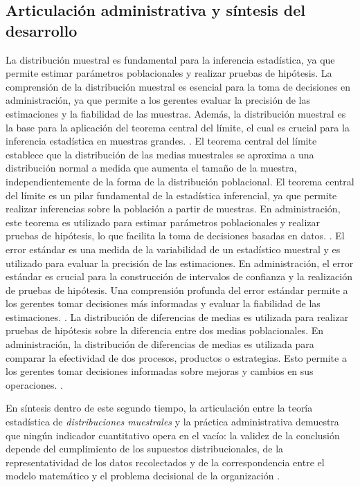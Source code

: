 {\subsection{Articulación administrativa y síntesis del desarrollo}
La distribución muestral es fundamental para la inferencia estadística, ya que permite estimar parámetros poblacionales y realizar pruebas de hipótesis. La comprensión de la distribución muestral es esencial para la toma de decisiones en administración, ya que permite a los gerentes evaluar la precisión de las estimaciones y la fiabilidad de las muestras. Además, la distribución muestral es la base para la aplicación del teorema central del límite, el cual es crucial para la inferencia estadística en muestras grandes. \citep{holmesBusiness2023,nistHandbook}.
El teorema central del límite establece que la distribución de las medias muestrales se aproxima a una distribución normal a medida que aumenta el tamaño de la muestra, independientemente de la forma de la distribución poblacional. El teorema central del límite es un pilar fundamental de la estadística inferencial, ya que permite realizar inferencias sobre la población a partir de muestras. En administración, este teorema es utilizado para estimar parámetros poblacionales y realizar pruebas de hipótesis, lo que facilita la toma de decisiones basadas en datos. \citep{holmesBusiness2023,nistHandbook}.
El error estándar es una medida de la variabilidad de un estadístico muestral y es utilizado para evaluar la precisión de las estimaciones. En administración, el error estándar es crucial para la construcción de intervalos de confianza y la realización de pruebas de hipótesis. Una comprensión profunda del error estándar permite a los gerentes tomar decisiones más informadas y evaluar la fiabilidad de las estimaciones. \citep{holmesBusiness2023,nistHandbook}.
La distribución de diferencias de medias es utilizada para realizar pruebas de hipótesis sobre la diferencia entre dos medias poblacionales. En administración, la distribución de diferencias de medias es utilizada para comparar la efectividad de dos procesos, productos o estrategias. Esto permite a los gerentes tomar decisiones informadas sobre mejoras y cambios en sus operaciones. \citep{holmesBusiness2023,nistHandbook}.

En síntesis dentro de este segundo tiempo, la articulación entre la teoría estadística de \textit{distribuciones muestrales} y la práctica administrativa demuestra que ningún indicador cuantitativo opera en el vacío: la validez de la conclusión depende del cumplimiento de los supuestos distribucionales, de la representatividad de los datos recolectados y de la correspondencia entre el modelo matemático y el problema decisional de la organización \citep{anderson2012,nistHandbook,guarin2002}.

}
